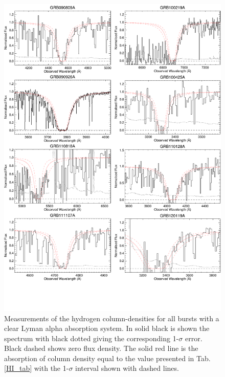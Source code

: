 \documentclass{aa}    %
\begin{document}
\begin{figure}
	\centering
	\includegraphics[page=1, width=16cm]{figures/HI_measurements.pdf}
	\caption{ Measurements of the hydrogen column-densities for all bursts with a clear Lyman alpha absorption system. In solid black is shown the spectrum with black dotted giving the corresponding 1-$\sigma$ error. Black dashed shows zero flux density. The solid red line is the absorption of column density equal to the value presented in Tab. \ref{HI_tab} with the 1-$\sigma$ interval shown with dashed lines.}
	\label{fig:HI1}
\end{figure}
\end{document}
